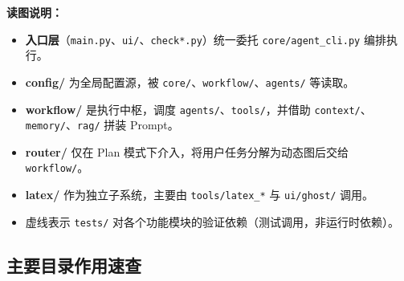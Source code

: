 \noindent\textbf{读图说明：}
\begin{itemize}[leftmargin=2em]
    \item \textbf{入口层}（\texttt{main.py}、\texttt{ui/}、\texttt{check*.py}）统一委托 \texttt{core/agent\_cli.py} 编排执行。
    \item \textbf{config/} 为全局配置源，被 \texttt{core/}、\texttt{workflow/}、\texttt{agents/} 等读取。
    \item \textbf{workflow/} 是执行中枢，调度 \texttt{agents/}、\texttt{tools/}，并借助 \texttt{context/}、\texttt{memory/}、\texttt{rag/} 拼装 Prompt。
    \item \textbf{router/} 仅在 Plan 模式下介入，将用户任务分解为动态图后交给 \texttt{workflow/}。
    \item \textbf{latex/} 作为独立子系统，主要由 \texttt{tools/latex\_*} 与 \texttt{ui/ghost/} 调用。
    \item 虚线表示 \texttt{tests/} 对各个功能模块的验证依赖（测试调用，非运行时依赖）。
\end{itemize}

\subsection{主要目录作用速查}

